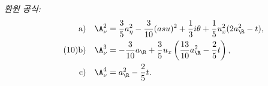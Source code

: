 
\noindent\emph{환원 공식:}
\[
\tag{10}
\begin{aligned}
\text{a)}\quad \A_\nu^2
&=\frac35a_\eta^2-\frac3{10}(asu)^2+\frac13 i\theta
+\frac15u_x^2(2a_\R^2-t),\\
\text{b)}\quad \A_\nu^3
&=-\frac3{10}a_\R+\frac35u_x\left(\frac{13}{10}a_\R^2-\frac25t\right),\\
\text{c)}\quad \A_\nu^4&=a_\R^2-\frac25t.
\end{aligned}
\]
